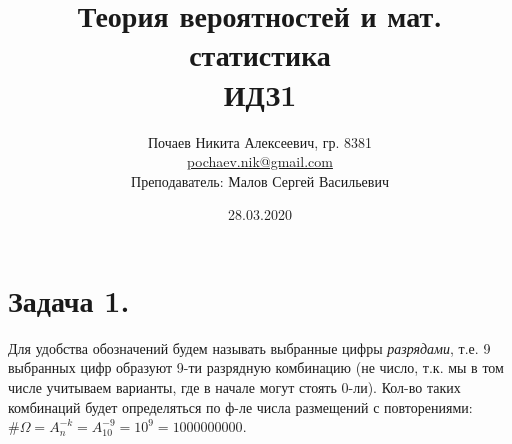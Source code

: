

\title{Теория вероятностей и мат. статистика \\ ИДЗ1}
\date{28.03.2020}
\author{Почаев Никита Алексеевич, гр. 8381 \\ \href{mailto:pochaev.nik@gmail.com}{pochaev.nik@gmail.com} \\ Преподаватель: Малов Сергей Васильевич}


	
\renewcommand{\figurename}{Рисунок}

\maketitle

\begin{figure}[H]
\end{figure}

\section*{Задача 1.}

Для удобства обозначений будем называть выбранные цифры \textit{разрядами}, т.е. 9 выбранных цифр образуют 9-ти разрядную комбинацию (не число, т.к. мы в том числе учитываем варианты, где в начале могут стоять 0-ли). Кол-во таких комбинаций будет определяться по ф-ле числа размещений с повторениями: $\# \Omega = A_n^{-k} = A_{10}^{-9} = 10^9 = 1000000000$.

